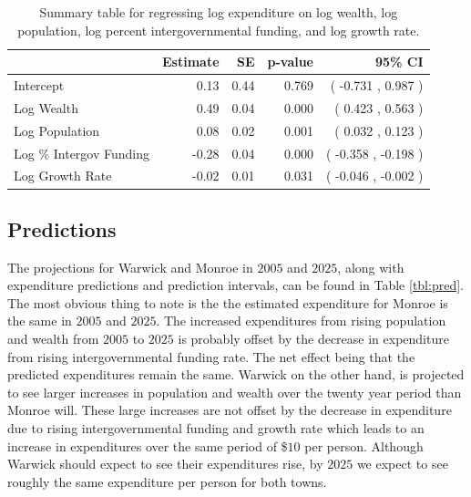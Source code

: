 \documentclass{article}\usepackage[]{graphicx}\usepackage[]{color}
\begin{document}



\begin{table}[ht]
\centering
\begin{tabular}{|l|rrrr|}
  \hline
 & Estimate & SE & p-value & 95\% CI \\ 
  \hline
Intercept & 0.13 & 0.44 & 0.769 & ( -0.731 , 0.987 ) \\ 
  Log Wealth & 0.49 & 0.04 & 0.000 & ( 0.423 , 0.563 ) \\ 
  Log Population & 0.08 & 0.02 & 0.001 & ( 0.032 , 0.123 ) \\ 
  Log \% Intergov Funding & -0.28 & 0.04 & 0.000 & ( -0.358 , -0.198 ) \\ 
  Log Growth Rate & -0.02 & 0.01 & 0.031 & ( -0.046 , -0.002 ) \\ 
   \hline
\end{tabular}
\caption{Summary table for regressing log expenditure on log wealth, log population, log percent intergovernmental funding, and log growth rate.} 
\label{tbl:regress}
\end{table}



\subsection{Predictions}

The projections for Warwick and Monroe in $2005$ and $2025$, along with expenditure predictions and prediction intervals, can be found in Table \ref{tbl:pred}. The most obvious thing to note is the the estimated expenditure for Monroe is the same in $2005$ and $2025$. The increased expenditures from rising population and wealth from $2005$ to $2025$ is probably offset by the decrease in expenditure from rising intergovernmental funding rate. The net effect being that the predicted expenditures remain the same. Warwick on the other hand, is projected to see larger increases in population and wealth over the twenty year period than Monroe will. These large increases are not offset by the decrease in expenditure due to rising intergovernmental funding and growth rate which leads to an increase in expenditures over the same period of \$$10$ per person. Although Warwick should expect to see their expenditures rise, by $2025$ we expect to see roughly the same expenditure per person for both towns.
\end{document}
